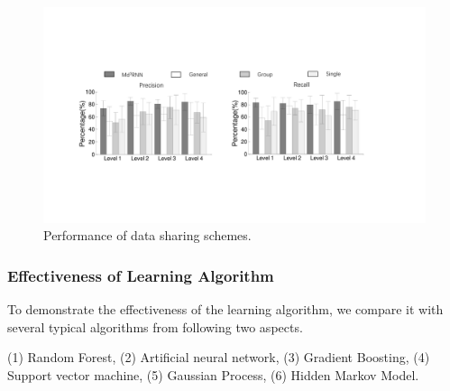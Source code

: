 \begin{figure}[h]
  \centering
  \includegraphics[width=0.8\columnwidth]{./img/performance_of_multi_division.pdf}
  \caption{Performance of data sharing schemes. }
  \label{fig:cmp_multi_division}
\end{figure}


\subsubsection{Effectiveness of \modelname Learning Algorithm}
\label{subsec:model_compare}
To demonstrate the effectiveness of the \modelname learning algorithm, we compare it with several typical algorithms from following two aspects.

(1) Random Forest, (2) Artificial neural network, (3) Gradient Boosting, (4) Support vector machine, (5) Gaussian Process, (6) Hidden Markov Model.

